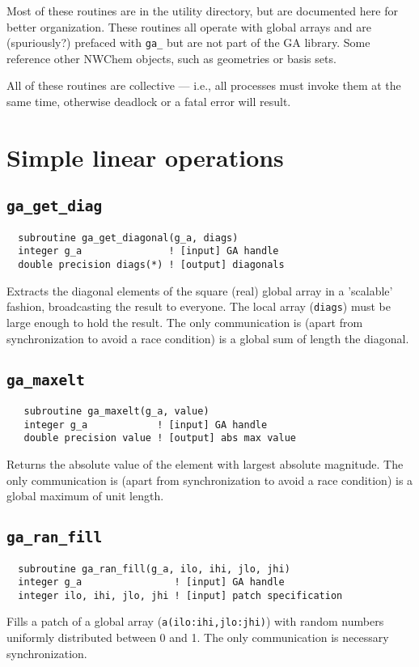 
Most of these routines are in the utility directory, but are
documented here for better organization.  These routines all operate
with global arrays and are (spuriously?)  prefaced with \verb+ga_+ but
are not part of the GA library.  Some reference other NWChem objects,
such as geometries or basis sets.

All of these routines are collective --- i.e., all processes must
invoke them at the same time, otherwise deadlock or a fatal error will
result.

\section{Simple linear operations}

\subsection{{\tt ga\_get\_diag}}
\begin{verbatim}
  subroutine ga_get_diagonal(g_a, diags)
  integer g_a               ! [input] GA handle
  double precision diags(*) ! [output] diagonals
\end{verbatim}
Extracts the diagonal elements of the square (real) global array in a
'scalable' fashion, broadcasting the result to everyone.  The local
array (\verb+diags+) must be large enough to hold the result.  The
only communication is (apart from synchronization to avoid a race
condition) is a global sum of length the diagonal.

\subsection{{\tt ga\_maxelt}}
\begin{verbatim}
   subroutine ga_maxelt(g_a, value)
   integer g_a            ! [input] GA handle
   double precision value ! [output] abs max value
\end{verbatim}
Returns the absolute value of the element with largest absolute
magnitude.  The only communication is (apart from synchronization to
avoid a race condition) is a global maximum of unit length.

\subsection{{\tt ga\_ran\_fill}}
\begin{verbatim}
  subroutine ga_ran_fill(g_a, ilo, ihi, jlo, jhi)
  integer g_a                ! [input] GA handle
  integer ilo, ihi, jlo, jhi ! [input] patch specification
\end{verbatim}
Fills a patch of a global array (\verb+a(ilo:ihi,jlo:jhi)+) with
random numbers uniformly distributed between 0 and 1.  The only
communication is necessary synchronization.

